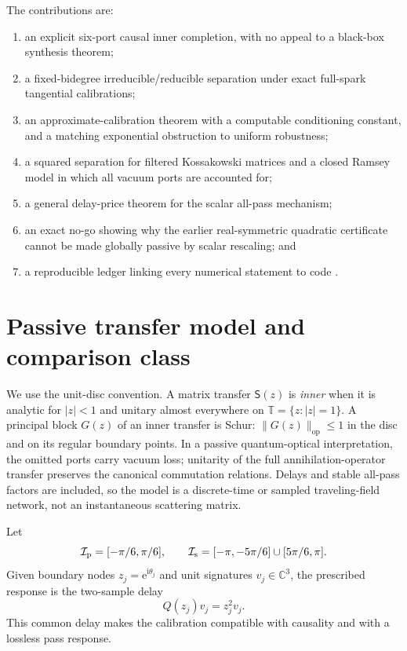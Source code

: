 \documentclass[11pt]{article}
\theoremstyle{definition}
\theoremstyle{remark}
\newcommand{\C}{\mathbb{C}}
\newcommand{\T}{\mathbb{T}}
\newcommand{\cI}{\mathcal{I}}
\newcommand{\op}{\mathrm{op}}
\newcommand{\e}{\mathrm{e}}
\begin{document}
The contributions are:
\begin{enumerate}
  \item an explicit six-port causal inner completion, with no appeal to a
  black-box synthesis theorem;
  \item a fixed-bidegree irreducible/reducible separation under exact
  full-spark tangential calibrations;
  \item an approximate-calibration theorem with a computable conditioning
  constant, and a matching exponential obstruction to uniform robustness;
  \item a squared separation for filtered Kossakowski matrices and a closed
  Ramsey model in which all vacuum ports are accounted for;
  \item a general delay-price theorem for the scalar all-pass mechanism;
  \item an exact no-go showing why the earlier real-symmetric quadratic
  certificate cannot be made globally passive by scalar rescaling; and
  \item a reproducible ledger linking every numerical statement to code
  \cite{ErikssonRepository2026}.
\end{enumerate}

\section{Passive transfer model and comparison class}

We use the unit-disc convention.  A matrix transfer $\mathsf{S}(z)$ is
\emph{inner} when it is analytic for $|z|<1$ and unitary almost everywhere on
$\T=\{z:|z|=1\}$.  A principal block $G(z)$ of an inner transfer is Schur:
$\|G(z)\|_{\op}\leq1$ in the disc and on its regular boundary points.  In a
passive quantum-optical interpretation, the omitted ports carry vacuum loss;
unitarity of the full annihilation-operator transfer preserves the canonical
commutation relations.  Delays and stable all-pass factors are included, so
the model is a discrete-time or sampled traveling-field network, not an
instantaneous scattering matrix.

Let
\[
 \cI_{\rm p}=[-\pi/6,\pi/6],\qquad
 \cI_{\rm s}=[-\pi,-5\pi/6]\cup[5\pi/6,\pi].
\]
Given boundary nodes $z_j=\e^{\mathrm{i}\theta_j}$ and unit signatures
$v_j\in\C^3$, the prescribed response is the two-sample delay
\begin{equation}\label{eq:calibration}
  Q(z_j)v_j=z_j^2v_j.
\end{equation}
This common delay makes the calibration compatible with causality and with a
lossless pass response.
\end{document}
